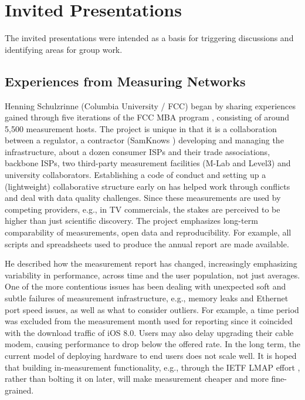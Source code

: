 \section{Invited Presentations}\label{sec:invited-presentations}

The invited presentations were intended as a basis for triggering discussions
and identifying areas for group work.

\subsection{Experiences from Measuring Networks}

Henning Schulzrinne (Columbia University / FCC) began by sharing experiences
gained through five iterations of the \ac{FCC} \ac{MBA} program \cite{mba},
consisting of around 5,500 measurement hosts. The project is unique in that it
is a collaboration between a regulator, a contractor (SamKnows
\cite{vbajpai:comst:2015}) developing and managing the infrastructure, about a
dozen consumer ISPs and their trade associations, backbone ISPs, two
third-party measurement facilities (M-Lab \cite{cdovrolis:ccr:2010} and
Level3) and university collaborators.  Establishing a code of conduct and
setting up a (lightweight) collaborative structure early on has helped work
through conflicts and deal with data quality challenges. Since these
measurements are used by competing providers, e.g., in TV commercials, the
stakes are perceived to be higher than just scientific discovery. The project
emphasizes long-term comparability of measurements, open data and
reproducibility. For example, all scripts and spreadsheets used to produce the
annual report are made available.

He described how the measurement report has changed, increasingly emphasizing
variability in performance, across time and the user population, not just
averages.  One of the more contentious issues has been dealing with unexpected
soft and subtle failures of measurement infrastructure, e.g., memory leaks and
Ethernet port speed issues, as well as what to consider outliers. For example,
a time period was excluded from the measurement month used for reporting since
it coincided with the download traffic of iOS 8.0. Users may also delay
upgrading their cable modem, causing performance to drop below the offered
rate. In the long term, the current model of deploying hardware to end users
does not scale well. It is hoped that building in-measurement functionality,
e.g., through the IETF \ac{LMAP} effort \cite{vbajpai:comst:2015}, rather than
bolting it on later, will make measurement cheaper and more fine-grained.

